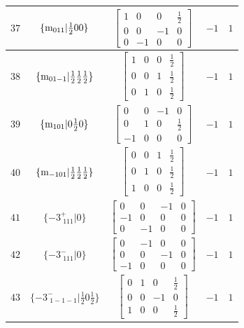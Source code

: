 \documentclass[fleqn,8pt]{jsarticle}
\begin{document}
\begin{longtable}{ccccc}
$ 37 $ & $ \{{\rm m}_{011}|\frac{1}{2} 0 0\} $ & $ \begin{bmatrix} 1 & 0 & 0 & \frac{1}{2} \\ 0 & 0 & -1 & 0 \\ 0 & -1 & 0 & 0 \end{bmatrix} $ & $ -1 $ & $ 1 $ \\ \hline
$ 38 $ & $ \{{\rm m}_{01-1}|\frac{1}{2} \frac{1}{2} \frac{1}{2}\} $ & $ \begin{bmatrix} 1 & 0 & 0 & \frac{1}{2} \\ 0 & 0 & 1 & \frac{1}{2} \\ 0 & 1 & 0 & \frac{1}{2} \end{bmatrix} $ & $ -1 $ & $ 1 $ \\ \hline
$ 39 $ & $ \{{\rm m}_{101}|0 \frac{1}{2} 0\} $ & $ \begin{bmatrix} 0 & 0 & -1 & 0 \\ 0 & 1 & 0 & \frac{1}{2} \\ -1 & 0 & 0 & 0 \end{bmatrix} $ & $ -1 $ & $ 1 $ \\ \hline
$ 40 $ & $ \{{\rm m}_{-101}|\frac{1}{2} \frac{1}{2} \frac{1}{2}\} $ & $ \begin{bmatrix} 0 & 0 & 1 & \frac{1}{2} \\ 0 & 1 & 0 & \frac{1}{2} \\ 1 & 0 & 0 & \frac{1}{2} \end{bmatrix} $ & $ -1 $ & $ 1 $ \\ \hline
$ 41 $ & $ \{-3^{+}_{\,\,111}|0\} $ & $ \begin{bmatrix} 0 & 0 & -1 & 0 \\ -1 & 0 & 0 & 0 \\ 0 & -1 & 0 & 0 \end{bmatrix} $ & $ -1 $ & $ 1 $ \\ \hline
$ 42 $ & $ \{-3^{-}_{\,\,111}|0\} $ & $ \begin{bmatrix} 0 & -1 & 0 & 0 \\ 0 & 0 & -1 & 0 \\ -1 & 0 & 0 & 0 \end{bmatrix} $ & $ -1 $ & $ 1 $ \\ \hline
$ 43 $ & $ \{-3^{-}_{\,\,1-1-1}|\frac{1}{2} 0 \frac{1}{2}\} $ & $ \begin{bmatrix} 0 & 1 & 0 & \frac{1}{2} \\ 0 & 0 & -1 & 0 \\ 1 & 0 & 0 & \frac{1}{2} \end{bmatrix} $ & $ -1 $ & $ 1 $ \\ \hline

\end{longtable}
\end{document}
